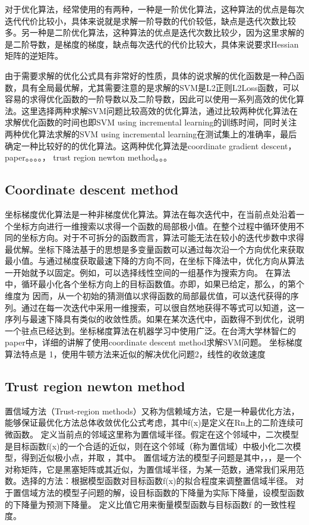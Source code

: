 \documentclass[master]{njuthesis}
\begin{document}
\begin{enumerate}
\begin{enumerate}
\begin{enumerate}
    对于优化算法，经常使用的有两种，一种是一阶优化算法，这种算法的优点是每次迭代代价比较小，具体来说就是求解一阶导数的代价较低，缺点是迭代次数比较多。另一种是二阶优化算法，这种算法的优点是迭代次数比较少，因为这里求解的是二阶导数，是梯度的梯度，缺点每次迭代的代价比较大，具体来说要求Hessian矩阵的逆矩阵。
    
    由于需要求解的优化公式具有非常好的性质，具体的说求解的优化函数是一种凸函数，具有全局最优解，尤其需要注意的是求解的SVM是L2正则L2Loss函数，可以容易的求得优化函数的一阶导数以及二阶导数，因此可以使用一系列高效的优化算法。这里选择两种求解SVM问题比较高效的优化算法，通过比较两种优化算法在求解优化函数的时间也即SVM using incremental learning的训练时间，同时关注两种优化算法求解的SVM using incremental learning在测试集上的准确率，最后确定一种比较好的的优化算法。这两种优化算法是coordinate gradient descent，paper。。。。， trust region newton method。。。

\subsection{Coordinate descent method}

    坐标梯度优化算法是一种非梯度优化算法。算法在每次迭代中，在当前点处沿着一个坐标方向进行一维搜索以求得一个函数的局部极小值。在整个过程中循环使用不同的坐标方向。对于不可拆分的函数而言，算法可能无法在较小的迭代步数中求得最优解。坐标下降法基于的思想是多变量函数可以通过每次沿一个方向优化来获取最小值。与通过梯度获取最速下降的方向不同，在坐标下降法中，优化方向从算法一开始就予以固定。例如，可以选择线性空间的一组基作为搜索方向。 在算法中，循环最小化各个坐标方向上的目标函数值。亦即，如果已给定，那么，的第个维度为
   因而，从一个初始的猜测值以求得函数的局部最优值，可以迭代获得的序列。通过在每一次迭代中采用一维搜索，可以很自然地获得不等式可以知道，这一序列与最速下降具有类似的收敛性质。如果在某次迭代中，函数得不到优化，说明一个驻点已经达到。坐标梯度算法在机器学习中使用广泛。在台湾大学林智仁的paper中，详细的讲解了使用coordinate descent method求解SVM问题。
    坐标梯度算法特点是 1，使用牛顿方法来近似的解决优化问题2，线性的收敛速度

\subsection{Trust region newton method}

    置信域方法（Trust-region methods）又称为信赖域方法，它是一种最优化方法，能够保证最优化方法总体收敛优化公式考虑，其中ƒ(x)是定义在Rn上的二阶连续可微函数。 定义当前点的邻域这里称为置信域半径。假定在这个邻域中，二次模型是目标函数ƒ(x)的一个合适的近似，则在这个邻域（称为置信域）中极小化二次模型，得到近似极小点，并取 ，其中。
    置信域方法的模型子问题是其中，，，是一个对称矩阵，它是黑塞矩阵或其近似，为置信域半径，为某一范数，通常我们采用范数。选择的方法：根据模型函数对目标函数ƒ(x)的拟合程度来调整置信域半径。 对于置信域方法的模型子问题的解，设目标函数的下降量为实际下降量，设模型函数的下降量为预测下降量。 定义比值它用来衡量模型函数与目标函数ƒ 的一致性程度。


\end{enumerate}
\end{enumerate}
\end{enumerate}
\end{document}
